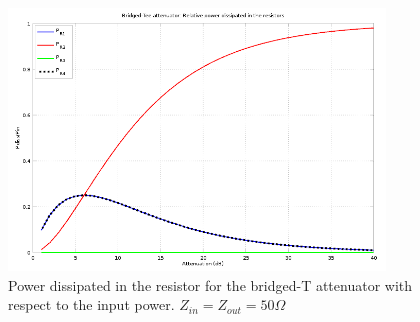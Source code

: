   \begin{figure}[ht]
    \centering
    \includegraphics[width=10cm]{./images/bridged-tee-relative-power-dissipation-50-Ohm.png}
    \caption{Power dissipated in the resistor for the bridged-T attenuator with respect to the input power. $Z_{in} = Z_{out} = 50 \Omega$}
    \label{fig:bridged-tee-relative-power-dissipation-50-Ohm}
  \end{figure}